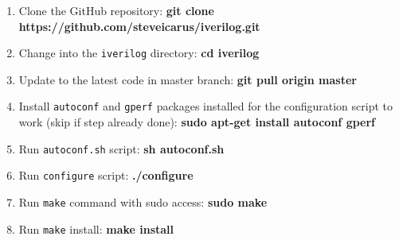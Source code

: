 \begin{enumerate}
\item Clone the GitHub repository:\newline
\small \textbf{git clone https://github.com/steveicarus/iverilog.git}

\item Change into the \verb|iverilog| directory:\newline
\small \textbf{cd iverilog}

\item Update to the latest code in master branch:\newline
\small \textbf{git pull origin master}

\item Install \verb|autoconf| and \verb|gperf| packages installed for the configuration script to work (skip if step already done):\newline
\small \textbf{sudo apt-get install autoconf gperf}

\item Run \verb|autoconf.sh| script:\newline
\small \textbf{sh autoconf.sh}

\item Run \verb|configure| script:\newline
\small \textbf{./configure}

\item Run \verb|make| command with sudo access:\newline
\small \textbf{sudo make}

\item Run \verb|make| install:\newline
\small \textbf{make install}
\end{enumerate}

